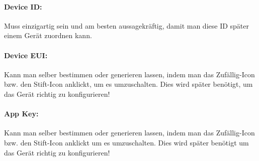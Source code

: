 \paragraph{Device ID:} Muss einzigartig sein und am besten aussagekräftig, damit man diese ID später einem Gerät zuordnen kann.

\paragraph{Device EUI:} Kann man selber bestimmen oder generieren lassen, indem man das Zufällig-Icon bzw. den Stift-Icon anklickt, um es umzuschalten. Dies wird später benötigt, um das Gerät richtig zu konfigurieren!

\paragraph{App Key:} Kann man selber bestimmen oder generieren lassen, indem man das Zufällig-Icon bzw. den Stift-Icon anklickt um es umzuschalten. Dies wird später benötigt um das Gerät richtig zu konfigurieren!

